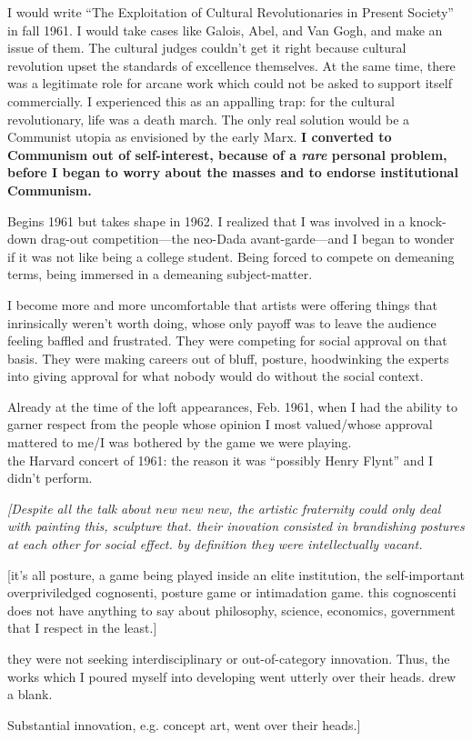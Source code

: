 I would write \enquote{The Exploitation of Cultural Revolutionaries in Present Society} in fall 1961.  I would take cases like Galois, Abel, and Van Gogh, and make an issue of them.  The cultural judges couldn't get it right because cultural revolution upset the standards of excellence themselves.  At the same time, there was a legitimate role for arcane work which could not be asked to support itself commercially.  I experienced this as an appalling trap:  for the cultural revolutionary, life was a death march.  The only real solution would be a Communist utopia as envisioned by the early Marx. \textbf{I converted to Communism out of self-interest, because of a \textit{rare} personal problem, before I began to worry about the masses and to endorse institutional Communism.}


Begins 1961 but takes shape in 1962.  I realized that I was involved in a knock-down drag-out competition---the neo-Dada avant-garde---and I began to wonder if it was not like being a college student.  Being forced to compete on demeaning terms, being immersed in a demeaning subject-matter.

      I become more and more uncomfortable that artists were offering things that inrinsically weren't worth doing, whose only payoff was to leave the audience feeling baffled and frustrated.  They were competing for social approval on that basis.  They were making careers out of bluff, posture, hoodwinking the experts into giving approval for what nobody would do without the social context. 

      Already at the time of the loft appearances, Feb. 1961, when I had the ability to garner respect from the people whose opinion I most valued\slash whose approval mattered to me\slash I was bothered by the game we were playing. \\

the Harvard concert of 1961:  the reason it was \enquote{possibly Henry Flynt} and I didn't perform.

{\itshape \footnotesize
[Despite all the talk about new new new, the artistic fraternity could only deal with painting this, sculpture that.  their inovation consisted in brandishing postures at each other for social effect.  by definition they were intellectually vacant.

{\scriptsize [it's all posture, a game being played inside an elite institution, the self-important overpriviledged cognosenti, posture game or intimadation game.  this cognoscenti does not have anything to say about philosophy, science, economics, government that I respect in the least.] }

they were not seeking interdisciplinary or out-of-category innovation.  Thus, the works which I poured myself into developing went utterly over their heads.  drew a blank.

Substantial innovation, e.g. concept art, went over their heads.]}

